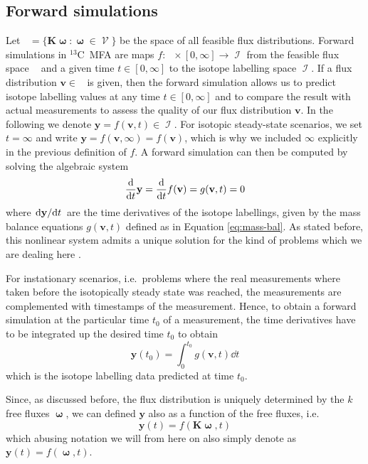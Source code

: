 \documentclass[10pt]{article}
\newcommand{\Ciso}{$^{13}$C~}
\newcommand{\ie}{i.e.~}
\newcommand{\mb}[1]{\mathbf{#1}}
\DeclareMathOperator\is{\mathcal{I}}
\DeclareMathOperator\fp{\mathcal{V}}
\DeclareMathOperator\ffp{\mathcal{\hat{V}}}
\DeclareMathOperator\bomega{\boldsymbol{\omega}}
\begin{document}
\subsection{Forward simulations}
\label{sec:forward-simulations}

Let $\ffp = \big\{ \mb{K}\bomega : \bomega \in \fp \big\}$ be the space of all feasible flux distributions.
Forward simulations in \Ciso MFA are maps $f: \ffp \times [0,\infty] \to \is$ from the feasible flux space $\ffp$
and a given time $t \in [0,\infty]$ to the isotope labelling space $\is$. 
If a flux distribution $\mb{v} \in \ffp$ is given, then the forward 
simulation allows us to predict isotope labelling values at any time $t \in [0,\infty]$ and to 
compare the result with actual measurements to assess the quality of our flux distribution $\mb{v}$.
In the following we denote $\mb{y} = f(\mb{v}, t) \in \is$. 
For isotopic steady-state scenarios, we set $t=\infty$ and write $\mb{y} = f(\mb{v}, \infty) = f(\mb{v})$,
which is why we included $\infty$ explicitly in the previous definition of $f$.
A forward simulation can then be computed by solving the algebraic system 
\[
    \dv{t}\mb{y} = \dv{t}f(\mb{v}) = g(\mb{v}, t) = 0
\]
where $\dv*{\mb{y}}{t}$ are the time derivatives of the isotope labellings, given by 
the mass balance equations $g(\mb{v},t)$ defined as in Equation \ref{eq:mass-bal}.
As stated before, this nonlinear system admits a unique solution for the kind of problems which we are dealing here \cite{wiechert01}.

For instationary scenarios, \ie problems where the real measurements where taken before the isotopically 
steady state was reached, the measurements are complemented with timestamps of the measurement. 
Hence, to obtain a forward simulation at the particular time $t_0$ of a measurement, 
the time derivatives have to be integrated up the desired time $t_0$ to obtain 
\[
    \mb{y}(t_0) = \int_0^{t_0} g(\mb{v},t) \dd{t}
\]
which is the isotope labelling data predicted at time $t_0$.

Since, as discussed before, the flux distribution is uniquely determined by the $k$ free fluxes $\bomega$,
we can defined $\mb{y}$ also as a function of the free fluxes, \ie
\[
    \mb{y}(t) = f(\mb{K}\bomega, t)
\]
which abusing notation we will from here on also simply denote as $\mb{y}(t) = f(\bomega,t)$.
\end{document}
